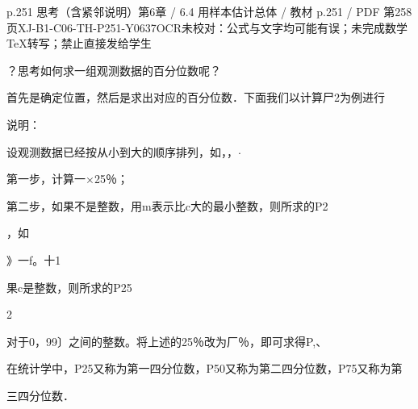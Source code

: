 \begin{bankitem}{p.251 思考（含紧邻说明）}{第6章 / 6.4 用样本估计总体 / 教材 p.251 / PDF 第258页}{XJ-B1-C06-TH-P251-Y0637}{OCR未校对：公式与文字均可能有误；未完成数学TeX转写；禁止直接发给学生}
\begin{ocrdraft}
\par
？思考如何求一组观测数据的百分位数呢？
\par
首先是确定位置，然后是求出对应的百分位数．下面我们以计算尸2为例进行
\par
说明：
\par
设观测数据已经按从小到大的顺序排列，如，，\ensuremath{\cdot}
\par
第一步，计算一\ensuremath{\times}25％；
\par
第二步，如果不是整数，用m表示比c大的最小整数，则所求的P2
\par
，如
\par
》一f。十1
\par
果c是整数，则所求的P25
\par
2
\par
对于0，99〕之间的整数。将上述的25％改为厂％，即可求得P,、
\par
在统计学中，P25又称为第一四分位数，P50又称为第二四分位数，P75又称为第
\par
三四分位数．
\end{ocrdraft}
\end{bankitem}

